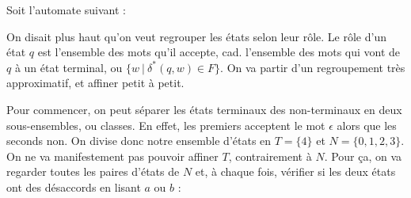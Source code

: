 \begin{example}

Soit l'automate suivant :



\begin{figure}[!ht]
\centering
{}
\end{figure}


On disait plus haut qu'on veut regrouper les états selon leur rôle. Le rôle d'un état $q$ est l'ensemble des mots qu'il accepte, cad. l'ensemble des mots qui vont de $q$ à un état terminal, ou $\{w ~|~ \delta^*(q,w) \in F\}$. On va partir d'un regroupement très approximatif, et affiner petit à petit. 

Pour commencer, on peut séparer les états terminaux des non-terminaux en deux sous-ensembles, ou classes. En effet, les premiers acceptent le mot $\epsilon$ alors que les seconds non. On divise donc notre ensemble d'états en $T = \{4\}$ et $N = \{0,1,2,3\}$. On ne va manifestement pas pouvoir affiner $T$, contrairement à $N$. Pour ça, on va regarder toutes les paires d'états de $N$ et, à chaque fois, vérifier si les deux états ont des désaccords en lisant $a$ ou $b$ :


\end{example}
